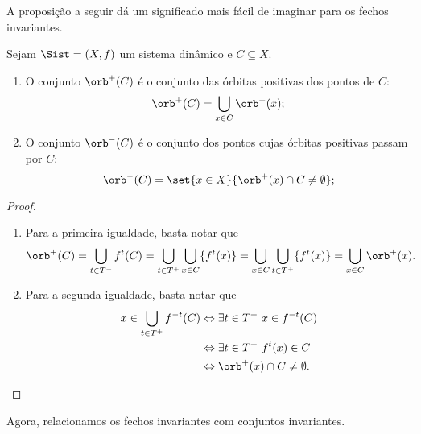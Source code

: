 A proposição a seguir dá um significado mais fácil de imaginar para os fechos invariantes.

\begin{proposition}
Sejam $\Sist=(X,f)$ um sistema dinâmico e $C \subseteq X$.
	\begin{enumerate}
	\item O conjunto $\orb^+(C)$ é o conjunto das órbitas positivas dos pontos de $C$:
		\begin{equation*}
		\orb^+(C) = \bigcup_{x \in C} \orb^+(x);
		\end{equation*}
	\item O conjunto $\orb^-(C)$ é o conjunto dos pontos cujas órbitas positivas passam por $C$:
		\begin{equation*}
		\orb^-(C) = \set{x \in X}{\orb^+(x) \cap C \neq \emptyset};
		\end{equation*}
	\end{enumerate}
\end{proposition}
\begin{proof}
	\begin{enumerate}
	\item Para a primeira igualdade, basta notar que
	\begin{equation*}
	\orb^+(C) = \bigcup_{t \in T^+} f^t(C) = \bigcup_{t \in T^+} \bigcup_{x \in C} \{f^t(x)\} = \bigcup_{x \in C} \bigcup_{t \in T^+} \{f^t(x)\} = \bigcup_{x \in C} \orb^+(x).
	\end{equation*}

	\item Para a segunda igualdade, basta notar que
	\begin{align*}
	x \in \bigcup_{t \in T^+} f^{-t}(C) &\Leftrightarrow \exists t \in T^+\ x \in f^{-t}(C) \\
		&\Leftrightarrow \exists t \in T^+\ f^{t}(x) \in C \\
		&\Leftrightarrow \orb^+(x) \cap C \neq \emptyset.
	\end{align*}
	\end{enumerate}
\end{proof}

Agora, relacionamos os fechos invariantes com conjuntos invariantes.

